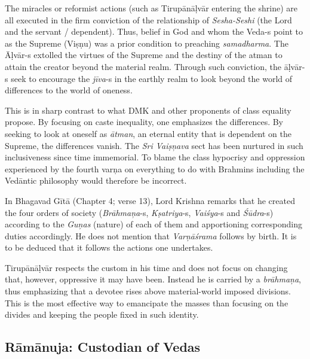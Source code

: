 The miracles or reformist actions (such as Tirupānāḷvār entering the shrine) are all executed in the firm conviction of the relationship of \textit{Sesha-Seshi} (the Lord and the servant / dependent). Thus, belief in God and whom the Veda-s point to as the Supreme (Viṣṇu) was a prior condition to preaching \textit{samadharma}. The Āḷvār-s extolled the virtues of the Supreme and the destiny of the atman to attain the creator beyond the material realm. Through such conviction, the āḷvār-s seek to encourage the \textit{jīva}-s in the earthly realm to look beyond the world of differences to the world of oneness.

This is in sharp contrast to what DMK and other proponents of class equality propose. By focusing on caste inequality, one emphasizes the differences. By seeking to look at oneself as \textit{ātman}, an eternal entity that is dependent on the Supreme, the differences vanish. The \textit{Sri Vaiṣņava} sect has been nurtured in such inclusiveness since time immemorial. To blame the class hypocrisy and oppression experienced by the fourth varņa on everything to do with Brahmins including the Vedāntic philosophy would therefore be incorrect.

In Bhagavad Gītā (Chapter 4; verse 13), Lord Krishna remarks that he created the four orders of society (\textit{Brāhmaņa}-s, \textit{Kṣatriya}-s, \textit{Vaiśya}-s and \textit{Śūdra}-s) according to the \textit{Guņas} (nature) of each of them and apportioning corresponding duties accordingly. He does not mention that \textit{Varņāśrama} follows by birth. It is to be deduced that it follows the actions one undertakes.

Tirupānāḷvār respects the custom in his time and does not focus on changing that, however, oppressive it may have been. Instead he is carried by a \textit{brāhmaņa}, thus emphasizing that a devotee rises above material-world imposed divisions. This is the most effective way to emancipate the masses than focusing on the divides and keeping the people fixed in such identity.


\subsection*{Rāmānuja: Custodian of Vedas}

